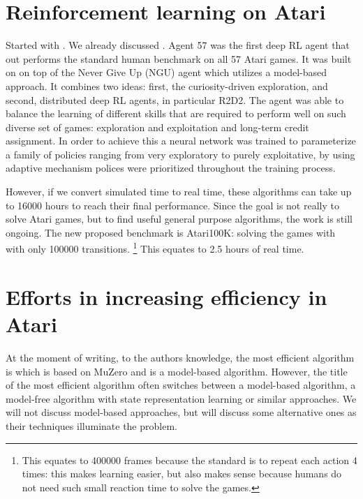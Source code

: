 \section{Reinforcement learning on Atari}
Started with \cite{mnih2013atari}. We already discussed \cite{rainbow}.
Agent 57 \cite{agent57}  was the first deep RL agent that out performs 
the standard human benchmark on all 57 Atari games.
It was built on  on top of the Never Give Up (NGU) agent which utilizes a model-based approach.
It combines two ideas: first, 
the curiosity-driven exploration, and second, 
distributed deep RL agents, in particular R2D2.
The agent was able to balance the learning of different 
skills that are required to perform well on such diverse set of games: 
exploration and exploitation and long-term credit assignment.
In order to achieve this a neural network was trained to parameterize 
a family of policies ranging from very exploratory to purely exploitative,
by using adaptive  mechanism polices were prioritized throughout the training process.


However, if we convert simulated time to real time,
these algorithms can take up to 16000 hours to reach their final performance.
Since the goal is not really to solve Atari games, but to find useful general purpose
algorithms, the work is still ongoing.
The new proposed benchmark is Atari100K: solving the games with with only 100000 transitions.
\footnote{This equates to 400000 frames because the standard is to repeat each action 4 times:
		this makes learning easier, but also makes sense because humans do not need
such small reaction time to solve the games.}
This equates to 2.5 hours of real time.

\section{Efforts in increasing efficiency in Atari}
At the moment of writing, to the authors knowledge, the most efficient 
algorithm is \cite{ye2021mastering} which is based on MuZero \cite{schrittwieser2020mastering}
and is a model-based algorithm.
However, the title of the most efficient algorithm often switches
between a model-based algorithm, a model-free algorithm with state representation learning
or similar approaches.
We will not discuss model-based approaches, but will discuss some alternative ones
as their techniques illuminate the problem.

